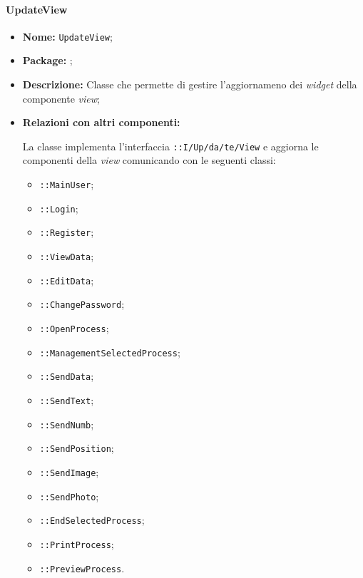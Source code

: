 \paragraph{UpdateView}
\begin{flushleft}
\begin{itemize}
\item \textbf{Nome:} \texttt{UpdateView};
\item \textbf{Package:} \texttt{\viewUser{}};
\item \textbf{Descrizione:} Classe che permette di gestire l’aggiornameno dei \textit{widget} della componente \textit{view};
\item \textbf{Relazioni con altri componenti:}
\begin{sloppypar}
La classe implementa l'interfaccia \texttt{\iViewUser{}::I\fshyp{}Up\fshyp{}da\fshyp{}te\fshyp{}View} e aggiorna le componenti della \textit{view} comunicando con le seguenti classi:
\begin{itemize}
\item \texttt{\viewUser{}::MainUser};
\item \texttt{\viewUser{}::Login};
\item \texttt{\viewUser{}::Register};
\item \texttt{\viewUser{}::ViewData};
\item \texttt{\viewUser{}::EditData};
\item \texttt{\viewUser{}::ChangePassword};
\item \texttt{\viewUser{}::OpenProcess};
\item \texttt{\viewUser{}::ManagementSelectedProcess};
\item \texttt{\viewUser{}::SendData};
\item \texttt{\viewUser{}::SendText};
\item \texttt{\viewUser{}::SendNumb};
\item \texttt{\viewUser{}::SendPosition};
\item \texttt{\viewUser{}::SendImage};
\item \texttt{\viewUser{}::SendPhoto};
\item \texttt{\viewUser{}::EndSelectedProcess};
\item \texttt{\viewUser{}::PrintProcess};
\item \texttt{\viewUser{}::PreviewProcess}.
\end{itemize}
\end{sloppypar}
\end{itemize}
\end{flushleft}

